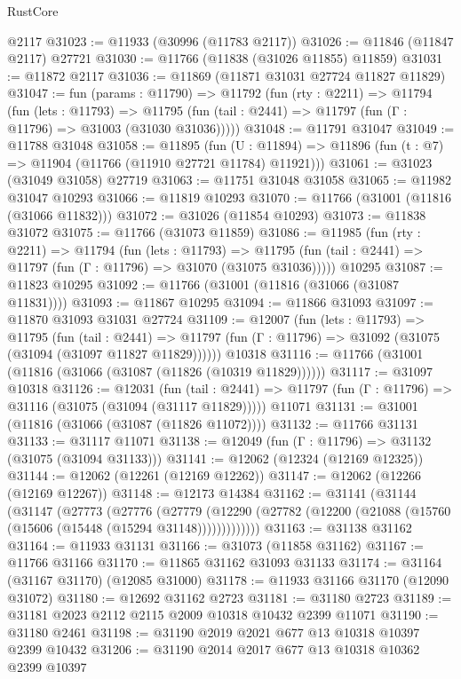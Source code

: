 \begin{lexlean}{RustCore}
\begin{coremodule}
    @2117
@31023 := @11933 (@30996 (@11783 @2117))
@31026 := @11846 (@11847 @2117) @27721
@31030 := @11766 (@11838 (@31026 @11855) @11859)
@31031 := @11872 @2117
@31036 := @11869 (@11871 @31031 @27724 @11827 @11829)
@31047 := fun (params : @11790) =>
  @11792
    (fun (rty : @2211) =>
    @11794
      (fun (lets : @11793) =>
      @11795 (fun (tail : @2441) => @11797 (fun (Γ : @11796) => @31003 (@31030 @31036)))))
@31048 := @11791 @31047
@31049 := @11788 @31048
@31058 := @11895
    (fun (U : @11894) => @11896 (fun (t : @7) => @11904 (@11766 (@11910 @27721 @11784) @11921)))
@31061 := @31023 (@31049 @31058) @27719
@31063 := @11751 @31048 @31058
@31065 := @11982 @31047 @10293
@31066 := @11819 @10293
@31070 := @11766 (@31001 (@11816 (@31066 @11832)))
@31072 := @31026 (@11854 @10293)
@31073 := @11838 @31072
@31075 := @11766 (@31073 @11859)
@31086 := @11985
    (fun (rty : @2211) =>
    @11794
      (fun (lets : @11793) =>
      @11795 (fun (tail : @2441) => @11797 (fun (Γ : @11796) => @31070 (@31075 @31036)))))
    @10295
@31087 := @11823 @10295
@31092 := @11766 (@31001 (@11816 (@31066 (@31087 @11831))))
@31093 := @11867 @10295
@31094 := @11866 @31093
@31097 := @11870 @31093 @31031 @27724
@31109 := @12007
    (fun (lets : @11793) =>
    @11795
      (fun (tail : @2441) =>
      @11797 (fun (Γ : @11796) => @31092 (@31075 (@31094 (@31097 @11827 @11829))))))
    @10318
@31116 := @11766 (@31001 (@11816 (@31066 (@31087 (@11826 (@10319 @11829))))))
@31117 := @31097 @10318
@31126 := @12031
    (fun (tail : @2441) => @11797 (fun (Γ : @11796) => @31116 (@31075 (@31094 (@31117 @11829)))))
    @11071
@31131 := @31001 (@11816 (@31066 (@31087 (@11826 @11072))))
@31132 := @11766 @31131
@31133 := @31117 @11071
@31138 := @12049 (fun (Γ : @11796) => @31132 (@31075 (@31094 @31133)))
@31141 := @12062 (@12324 (@12169 @12325))
@31144 := @12062 (@12261 (@12169 @12262))
@31147 := @12062 (@12266 (@12169 @12267))
@31148 := @12173 @14384
@31162 := @31141
    (@31144
      (@31147
        (@27773
          (@27776
            (@27779
              (@12290 (@27782 (@12200 (@21088 (@15760 (@15606 (@15448 (@15294 @31148)))))))))))))
@31163 := @31138 @31162
@31164 := @11933 @31131
@31166 := @31073 (@11858 @31162)
@31167 := @11766 @31166
@31170 := @11865 @31162 @31093 @31133
@31174 := @31164 (@31167 @31170) (@12085 @31000)
@31178 := @11933 @31166 @31170 (@12090 @31072)
@31180 := @12692 @31162 @2723
@31181 := @31180 @2723
@31189 := @31181 @2023 @2112 @2115 @2009 @10318 @10432 @2399 @11071
@31190 := @31180 @2461
@31198 := @31190 @2019 @2021 @677 @13 @10318 @10397 @2399 @10432
@31206 := @31190 @2014 @2017 @677 @13 @10318 @10362 @2399 @10397

\end{coremodule}
\end{lexlean}
